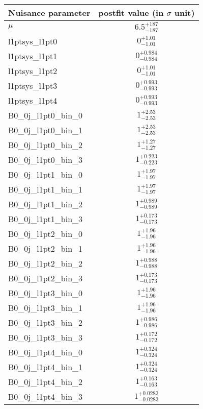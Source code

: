 
\begin{tabular}{|l|c|}
\hline
Nuisance parameter & postfit value (in $\sigma$ unit) \\\hline
$\mu$ & $6.5^{+187}_{-187}$ \\
l1ptsys\_l1pt0 & $0^{+1.01}_{-1.01}$ \\
l1ptsys\_l1pt1 & $0^{+0.984}_{-0.984}$ \\
l1ptsys\_l1pt2 & $0^{+1.01}_{-1.01}$ \\
l1ptsys\_l1pt3 & $0^{+0.993}_{-0.993}$ \\
l1ptsys\_l1pt4 & $0^{+0.993}_{-0.993}$ \\
B0\_0j\_l1pt0\_bin\_0 & $1^{+2.53}_{-2.53}$ \\
B0\_0j\_l1pt0\_bin\_1 & $1^{+2.53}_{-2.53}$ \\
B0\_0j\_l1pt0\_bin\_2 & $1^{+1.27}_{-1.27}$ \\
B0\_0j\_l1pt0\_bin\_3 & $1^{+0.223}_{-0.223}$ \\
B0\_0j\_l1pt1\_bin\_0 & $1^{+1.97}_{-1.97}$ \\
B0\_0j\_l1pt1\_bin\_1 & $1^{+1.97}_{-1.97}$ \\
B0\_0j\_l1pt1\_bin\_2 & $1^{+0.989}_{-0.989}$ \\
B0\_0j\_l1pt1\_bin\_3 & $1^{+0.173}_{-0.173}$ \\
B0\_0j\_l1pt2\_bin\_0 & $1^{+1.96}_{-1.96}$ \\
B0\_0j\_l1pt2\_bin\_1 & $1^{+1.96}_{-1.96}$ \\
B0\_0j\_l1pt2\_bin\_2 & $1^{+0.988}_{-0.988}$ \\
B0\_0j\_l1pt2\_bin\_3 & $1^{+0.173}_{-0.173}$ \\
B0\_0j\_l1pt3\_bin\_0 & $1^{+1.96}_{-1.96}$ \\
B0\_0j\_l1pt3\_bin\_1 & $1^{+1.96}_{-1.96}$ \\
B0\_0j\_l1pt3\_bin\_2 & $1^{+0.986}_{-0.986}$ \\
B0\_0j\_l1pt3\_bin\_3 & $1^{+0.172}_{-0.172}$ \\
B0\_0j\_l1pt4\_bin\_0 & $1^{+0.324}_{-0.324}$ \\
B0\_0j\_l1pt4\_bin\_1 & $1^{+0.324}_{-0.324}$ \\
B0\_0j\_l1pt4\_bin\_2 & $1^{+0.163}_{-0.163}$ \\
B0\_0j\_l1pt4\_bin\_3 & $1^{+0.0283}_{-0.0283}$ \\
\hline
\end{tabular}
